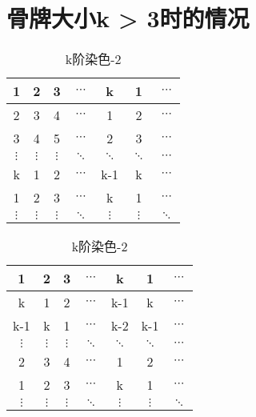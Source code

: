 \section{骨牌大小k > 3时的情况}

\begin{table}[h]
	\caption{k阶染色}
	\label{fig:k-order-staining}
	\begin{subtable}{.5\linewidth}
		\centering
		\caption{k阶染色-1}
		\begin{tabular}{|c|c|c|c|c|c|c|}
			\hline
			1        & 2        & 3        & $\cdots$ & k        & 1        & $\cdots$ \\
			\hline
			2        & 3        & 4        & $\cdots$ & 1        & 2        & $\cdots$ \\
			\hline
			3        & 4        & 5        & $\cdots$ & 2        & 3        & $\cdots$ \\
			\hline
			$\vdots$ & $\vdots$ & $\vdots$ & $\ddots$ & $\ddots$ & $\ddots$ & $\cdots$ \\
			\hline
			k        & 1        & 2        & $\cdots$ & k-1      & k        & $\cdots$ \\
			\hline
			1        & 2        & 3        & $\cdots$ & k        & 1        & $\cdots$ \\
			\hline
			$\vdots$ & $\vdots$ & $\vdots$ & $\ddots$ & $\vdots$ & $\vdots$ & $\ddots$ \\
			\hline
		\end{tabular}
		\label{fig:k-order-staining-1}
	\end{subtable}%
	\begin{subtable}{.5\linewidth}
		\centering
		\caption{k阶染色-2}
		\begin{tabular}{|c|c|c|c|c|c|c|}
			\hline
			1        & 2        & 3        & $\cdots$ & k        & 1        & $\cdots$ \\
			\hline
			k        & 1        & 2        & $\cdots$ & k-1      & k        & $\cdots$ \\
			\hline
			k-1      & k        & 1        & $\cdots$ & k-2      & k-1      & $\cdots$ \\
			\hline
			$\vdots$ & $\vdots$ & $\vdots$ & $\ddots$ & $\ddots$ & $\ddots$ & $\cdots$ \\
			\hline
			2        & 3        & 4        & $\cdots$ & 1        & 2        & $\cdots$ \\
			\hline
			1        & 2        & 3        & $\cdots$ & k        & 1        & $\cdots$ \\
			\hline
			$\vdots$ & $\vdots$ & $\vdots$ & $\ddots$ & $\vdots$ & $\vdots$ & $\ddots$ \\
			\hline
		\end{tabular}
		\label{fig:k-order-staining-2}
	\end{subtable}
\end{table}


